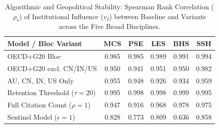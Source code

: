 \begin{table}[htbp]
\centering
\small
\caption{Algorithmic and Geopolitical Stability: Spearman Rank Correlation ($\rho_s$) of Institutional Influence ($v_I$) between Baseline and Variants across the Five Broad Disciplines.}
\label{tab:sensitivity_correlations}
\begin{tabularx}{\textwidth}{>{\raggedright\arraybackslash}X ccccc}
\toprule
\textbf{Model / Bloc Variant} & \textbf{MCS} & \textbf{PSE} & \textbf{LES} & \textbf{BHS} & \textbf{SSH} \\
\midrule
OECD+G20 Bloc & 0.985 & 0.985 & 0.989 & 0.991 & 0.994 \\
OECD+G20 excl. CN/IN/US & 0.950 & 0.941 & 0.951 & 0.950 & 0.982 \\
AU, CN, IN, US Only & 0.955 & 0.948 & 0.926 & 0.934 & 0.959 \\
Retention Threshold ($\tau=20$) & 0.995 & 0.998 & 0.998 & 0.999 & 0.995 \\
Full Citation Count ($\rho=1$) & 0.947 & 0.916 & 0.968 & 0.978 & 0.975 \\
Sentinel Model ($\epsilon=1$) & 0.828 & 0.773 & 0.809 & 0.636 & 0.858 \\
\bottomrule
\end{tabularx}
\end{table}
